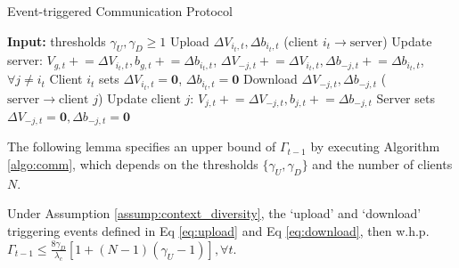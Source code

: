 \begin{algorithm}[h]
    \caption{Event-triggered Communication Protocol} \label{algo:comm}
  \begin{algorithmic}[1]
    \STATE \textbf{Input:} thresholds $\gamma_{U}, \gamma_{D} \geq 1$
            \STATE Upload $\Delta{V}_{i_{t},t},\Delta{b}_{i_{t},t}$ ($\text{client } i_{t} \rightarrow \text{server}$) 
            \STATE Update server:
            $V_{g,t}\mathrel{+}=\Delta V_{i_{t},t},b_{g,t}\mathrel{+}=\Delta b_{i_{t},t}$, $\Delta V_{-j,t}\mathrel{+}=\Delta V_{i_{t},t},\Delta b_{-j,t}\mathrel{+}=\Delta b_{i_{t},t}$, $\forall j \neq i_{t}$
            \STATE Client $i_{t}$ sets $\Delta{V}_{i_{t},t}=\textbf{0}$, $\Delta{b}_{i_{t},t}=\textbf{0}$
                    \STATE Download $\Delta{V}_{-j,t},\Delta{b}_{-j,t}$ ($\text{server} \rightarrow \text{client } j$)
                    \STATE Update client $j$:
                    $V_{j,t}\mathrel{+}=\Delta V_{-j,t},b_{j,t}\mathrel{+}=\Delta b_{-j,t}$
                    \STATE Server sets $\Delta{V}_{-j,t}=\textbf{0},\Delta{b}_{-j,t}=\textbf{0}$
                \ENDIF
            \ENDFOR
        \ENDIF
  \end{algorithmic}
\end{algorithm}

The following lemma specifies an upper bound of $\Gamma_{t-1}$ by executing Algorithm \ref{algo:comm}, which depends on the thresholds $\{\gamma_{U}, \gamma_{D}\}$ and the number of clients $N$.
\begin{lemma}\label{lem:Gamma_upperbound}
Under Assumption \ref{assump:context_diversity}, the `upload' and `download' triggering events defined in Eq \eqref{eq:upload} and Eq \eqref{eq:download}, then w.h.p. $\Gamma_{t-1} \leq \frac{8\gamma_{D}}{\lambda_{c}} [1+(N-1)(\gamma_{U}-1)],\forall t$.
\end{lemma}

